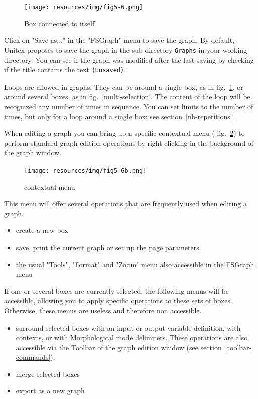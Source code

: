 \begin{figure}[!ht]
\begin{center}
\texttt{[image: resources/img/fig5-6.png]}
\caption{Box connected to itself\label{fig-loop-box}}
\end{center}
\end{figure}

\bigskip
\noindent Click on "Save as..." in the "FSGraph" menu to save the graph.
 By default, Unitex proposes to save the graph in the
sub-directory \verb+Graphs+ in your working directory.
You can see if the graph was modified after the last
saving by checking if the title contains the text \verb+(Unsaved)+.

\bigskip
\noindent Loops are allowed in graphs. They can be around a single box, as in fig.~\ref{fig-loop-box},
or around several boxes, as in fig.~\ref{multi-selection}.
The content of the loop will be recognized any number of times in sequence.
You can set limits to the number of times, but only for a loop around a single box:
see section~\ref{nb-repetitions}.

\bigskip
\noindent When editing a graph you can bring up a specific contextual menu ( fig.~\ref{contextual-menu}) to 
perform standard graph edition operations by right clicking in the background of the graph window.

\bigskip
\begin{figure}[!ht]
\begin{center}
\texttt{[image: resources/img/fig5-6b.png]}
\caption{contextual menu\label{contextual-menu}}
\end{center}
\end{figure}

\noindent This menu will offer several operations that are frequently used when editing a graph.
\begin{itemize}
\item create a new box
\item save, print the current graph or set up the page parameters
\item the usual "Tools", "Format" and "Zoom" menu also accessible in the FSGraph menu 
\end{itemize}
If one or several boxes are currently selected, the following menus will be accessible, allowing you to apply specific operations to these sets of boxes. Otherwise, these menus are useless and therefore non accessible. 
\begin{itemize}
\item surround selected boxes with an input or output variable definition, with contexts, or with Morphological mode delimiters. These operations are also accessible via the Toolbar of the graph edition window (see section~\ref{toolbar-commands}). 
\item merge selected boxes
\item export as a new graph
\end{itemize}
\bigskip


